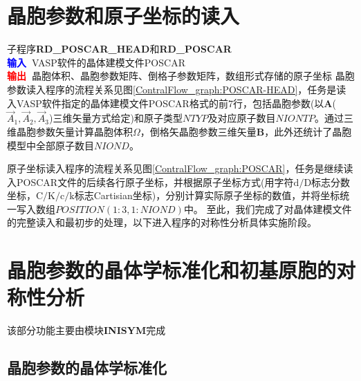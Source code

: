 \documentclass{article}      %
\begin{document}
\section{晶胞参数和原子坐标的读入}
子程序\textbf{RD\_POSCAR\_HEAD}和\textbf{RD\_POSCAR}\\
\textbf{\textcolor{blue}{输入~}}\textrm{VASP}软件的晶体建模文件\textrm{POSCAR}\\
\textbf{\textcolor{red}{输出~}}晶胞体积、晶胞参数矩阵、倒格子参数矩阵，数组形式存储的原子坐标
晶胞参数读入程序的流程关系见图\ref{ContralFlow_graph:POSCAR-HEAD}，任务是读入\textrm{VASP}软件指定的晶体建模文件\textrm{POSCAR}格式的前7行，包括晶胞参数(以$\mathbf{A}$($\vec A_1,\vec A_2,\vec A_3$)三维矢量方式给定)和原子类型$\mathit{NTYP}$及对应原子数目$\mathit{NIONTP}$。通过三维晶胞参数矢量计算晶胞体积$\Omega$，倒格矢晶胞参数三维矢量$\mathbf{B}$，此外还统计了晶胞模型中全部原子数目$\mathit{NIOND}$。

原子坐标读入程序的流程关系见图\ref{ContralFlow_graph:POSCAR}，任务是继续读入\textrm{POSCAR}文件的后续各行原子坐标，并根据原子坐标方式(用字符$\mathrm{d/D}$标志分数坐标，$\mathrm{C/K/c/k}$标志\textrm{Cartisian}坐标)，分别计算实际原子坐标的数值，并将坐标统一写入数组$\mathit{POSITION}(1:3,1:\mathit{NIOND})$中。
至此，我们完成了对晶体建模文件的完整读入和最初步的处理，以下进入程序的对称性分析具体实施阶段。

\section{晶胞参数的晶体学标准化和初基原胞的对称性分析}
该部分功能主要由模块\textbf{INISYM}完成
\subsection{晶胞参数的晶体学标准化}
\end{document}
